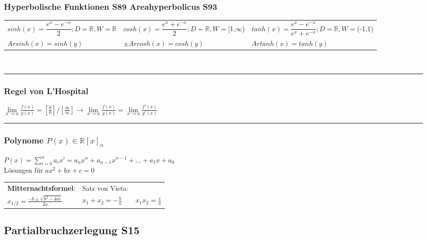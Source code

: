 \documentclass[6pt,a4paper]{scrartcl}
\begin{document}
\begin{multicols*}{2}
\subsubsection{Hyperbolische Funktionen \color{red}S89 \color{black}Areahyperbolicus \color{red}S93}
\begin{tabular}{lll}
	$sinh(x)=\dfrac{e^{x}-e^{-x}}{2};D=\mathbb{R},W=\mathbb{R}$ & $cosh(x)=\dfrac{e^{x}+e^{-x}}{2};D=\mathbb{R},W=$[1,$\infty$) & $tanh(x)=\dfrac{e^{x}-e^{-x}}{e^{x}+e^{-x}};D=\mathbb{R},W=$(-1,1)\\
	$Arsinh(x)=sinh(y)$ & $\pm Arcosh(x)=cosh(y)$ & $Artanh(x)=tanh(y)$\\
\end{tabular}\\
\hrule
\subsubsection{Regel von L'Hospital}
$\lim\limits_{x \rightarrow a} \frac{f(x)}{g(x)} = \left[ \frac{0}{0} \right] / \left[ \frac{\infty}{\infty} \right] \rightarrow \lim\limits_{x \rightarrow a} \frac{f(x)}{g(x)} = \lim\limits_{x \rightarrow a} \frac{f'(x)}{g'(x)}$
\hrule
\subsubsection{Polynome $P(x)\in\mathbb R[x]_n$}
$P(x)=\sum_{i=0}^n a_ix^i=a_n x^n+a_{n-1} x^{n-1}+\dotsc+a_1x+a_0$ \\
Lösungen für $ax^2+bx+c=0$ \\
\begin{tabular}{l|l}
\textbf{Mitternachtsformel}:  &  Satz von Vieta:\\
$x_{1/2}=\frac{-b\pm\sqrt{b^2-4ac}}{2a}$  \quad & \quad   $x_1 + x_2 = - \frac{b}{a} \qquad x_1 x_2 = \frac{c}{a}$
\end{tabular}







\subsection{Partialbruchzerlegung \color{red} S15}
\label{sub:allgemeines}




\end{multicols*}
\end{document}
